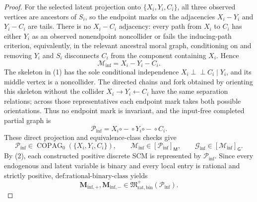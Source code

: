 \documentclass{article}
\begin{document}
\begin{proof}
For the selected latent projection onto \(\{X_i,Y_i,C_i\}\), all three observed vertices are ancestors of \(S_i\), so the endpoint marks on the adjacencies \(X_i-Y_i\) and \(Y_i-C_i\) are tails.  There is no \(X_i-C_i\) adjacency: every path from \(X_i\) to \(C_i\) has either \(Y_i\) as an observed nonendpoint noncollider or fails the inducing-path criterion, equivalently, in the relevant ancestral moral graph, conditioning on and removing \(Y_i\) and \(S_i\) disconnects \(C_i\) from the component containing \(X_i\).  Hence
\[
 \mathcal M_{\mathrm{inf}}=X_i-Y_i-C_i.                 \tag{1}
\]
The skeleton in (1) has the sole conditional independence \(X_i\mathbin{\perp\!\!\!\perp}C_i\mid Y_i\), and its middle vertex is a noncollider.  The directed chains and fork obtained by orienting this skeleton without the collider \(X_i\to Y_i\leftarrow C_i\) have the same separation relations; across those representatives each endpoint mark takes both possible orientations.  Thus no endpoint mark is invariant, and the input-free completed partial graph is
\[
 \mathcal P_{\mathrm{inf}}
 =X_i\mathbin{\circ\!-\!\circ}Y_i
       \mathbin{\circ\!-\!\circ}C_i.
\]
These direct projection and equivalence-class checks give
\[
 \mathcal P_{\mathrm{inf}}\in\operatorname{COPAG}_0(\{X_i,Y_i,C_i\}),
 \qquad \mathcal M_{\mathrm{inf}}\in[\mathcal P_{\mathrm{inf}}]_{\mathsf M},
 \qquad \mathcal G_{\mathrm{inf}}\in[\mathcal M_{\mathrm{inf}}]_{\mathsf G}. \tag{2}
\]
By (2), each constructed positive discrete SCM is represented by \(\mathcal P_{\mathrm{inf}}\).  Since every endogenous and latent variable is binary and every local entry is rational and strictly positive, \(\text{def:rational-binary-class}\) yields
\[
 \mathbf M_{\mathrm{inf},+},\mathbf M_{\mathrm{inf},-}
 \in\mathfrak M_{\mathrm{rat,bin}}^+(\mathcal P_{\mathrm{inf}}). \tag{3}
\]


\end{proof}
\end{document}

